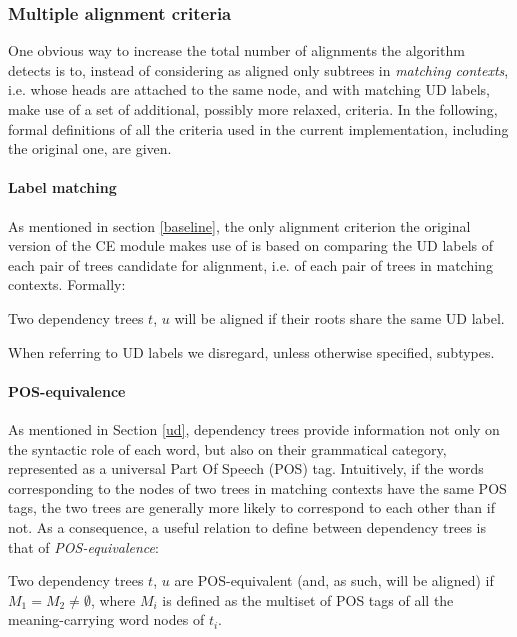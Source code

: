 \subsubsection{Multiple alignment criteria} \label{criteria}
One obvious way to increase the total number of alignments the algorithm detects is to, instead of considering as aligned only subtrees in \textit{matching contexts}, i.e. whose heads are attached to the same node, and with matching UD labels, make use of a set of additional, possibly more relaxed, criteria. In the following, formal definitions of all the criteria used in the current implementation, including the original one, are given.

\paragraph{Label matching}
As mentioned in section \ref{baseline}, the only alignment criterion the original version of the CE module makes use of is based on comparing the UD labels of each pair of trees candidate for alignment, i.e. of each pair of trees in matching contexts. Formally: \smallskip

\begin{criterion} \label{udmatch}
 Two dependency trees $t$, $u$ will be aligned if their roots share the same UD label.
\end{criterion} \smallskip

When referring to UD labels we disregard, unless otherwise specified, subtypes.

\paragraph{POS-equivalence}
As mentioned in Section \ref{ud}, dependency trees provide information not only on the syntactic role of each word, but also on their grammatical category, represented as a universal Part Of Speech (POS) tag. Intuitively, if the words corresponding to the nodes of two trees in matching contexts have the same POS tags, the two trees are generally more likely to correspond to each other than if not. 
As a consequence, a useful relation to define between dependency trees is that of \textit{POS-equivalence}: \smallskip

\begin{criterion} \label{poseq}
 Two dependency trees $t$, $u$ are POS-equivalent (and, as such, will be aligned) if $M_1 = M_2 \neq \emptyset$, where $M_i$ is defined as the multiset of POS tags of all the meaning-carrying word nodes of $t_i$. 
\end{criterion} \smallskip


